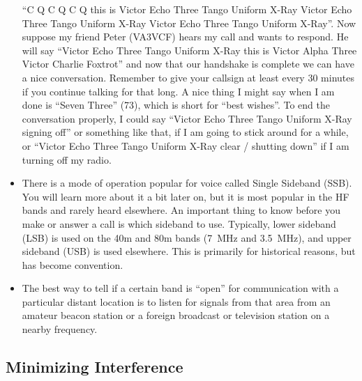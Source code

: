 \documentclass[letterpaper,12pt]{scrartcl}
\begin{document}
\begin{itemize}
``C Q C Q C Q this is Victor Echo Three Tango Uniform X-Ray Victor Echo Three Tango Uniform X-Ray Victor Echo Three Tango Uniform X-Ray''.
Now suppose my friend Peter (VA3VCF) hears my call and wants to respond. He will say ``Victor Echo Three Tango Uniform X-Ray this is Victor Alpha Three Victor Charlie Foxtrot''
and now that our handshake is complete we can have a nice conversation.
Remember to give your callsign at least every 30 minutes if you continue talking for that long.
A nice thing I might say when I am done is ``Seven Three'' (73), which is short for ``best wishes''.
To end the conversation properly, I could say ``Victor Echo Three Tango Uniform X-Ray signing off'' or something like that, if I am going to stick around for a while,
or ``Victor Echo Three Tango Uniform X-Ray clear / shutting down'' if I am turning off my radio.
\item There is a mode of operation popular for voice called Single Sideband (SSB). You will learn more about it a bit later on, but
it is most popular in the HF bands and rarely heard elsewhere. An important thing to know before you make or answer a call is which sideband to use.
Typically, lower sideband (LSB) is used on the 40m and 80m bands (7~MHz and 3.5~MHz), and upper sideband (USB) is used elsewhere. This is primarily for historical reasons,
but has become convention.
\item The best way to tell if a certain band is ``open'' for communication with a particular distant location is to listen for signals from that area
from an amateur beacon station or a foreign broadcast or television station on a nearby frequency.
\end{itemize}

\subsection{Minimizing Interference}
\end{document}
